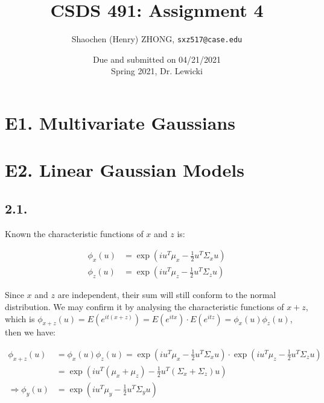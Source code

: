 \documentclass[11pt]{article}
\newcommand{\ilc}{\texttt}
\begin{document}
\title{\textbf{CSDS 491: Assignment 4}}

\author{Shaochen (Henry) ZHONG, \ilc{sxz517@case.edu}}

\date{Due and submitted on 04/21/2021 \\ Spring 2021, Dr. Lewicki}
\maketitle

\section*{E1. Multivariate Gaussians}
\section*{E2. Linear Gaussian Models}

\subsection*{2.1.}

Known the characteristic functions of $x$ and $z$ is:

\begin{align*}
    \phi_x(u) &= \exp(i u^T \mu_x - \frac{1}{2} u^T \Sigma_x u) \\
    \phi_z(u) &= \exp(i u^T \mu_z - \frac{1}{2} u^T \Sigma_z u)
\end{align*}

Since $x$ and $z$ are independent, their sum will still conform to the normal distribution. We may confirm it by analysing the characteristic functions of $x + z$, which is $\phi_{x + z}(u) = E(e^{it(x + z)}) = E(e^{itx}) \cdot E(e^{itz}) = \phi_{x}(u) \phi_{z}(u)$, then we have:

\begin{align*}
    \phi_{x + z}(u) &= \phi_{x}(u) \phi_{z}(u) = \exp(i u^T \mu_x - \frac{1}{2} u^T \Sigma_x u) \cdot \exp(i u^T \mu_z - \frac{1}{2} u^T \Sigma_z u) \\
    &= \exp(i u^T (\mu_x + \mu_z) - \frac{1}{2} u^T (\Sigma_x + \Sigma_z) u) \\
    \Longrightarrow \phi_y(u) &= \exp(i u^T \mu_y - \frac{1}{2} u^T \Sigma_y u)
\end{align*}
\end{document}

